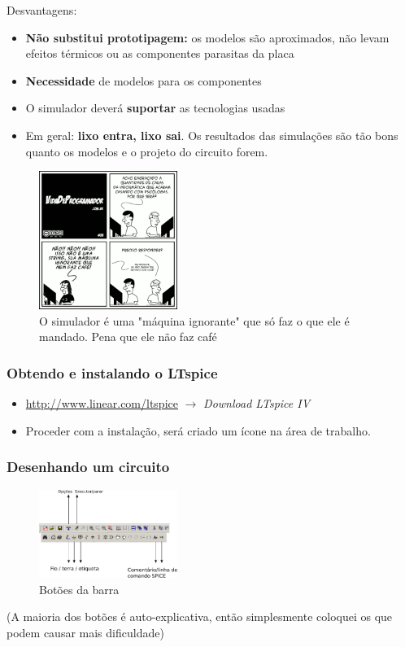 \documentclass{beamer}
\begin{document}
\begin{frame}
Desvantagens:
\begin{itemize}
\item{\textbf{Não substitui prototipagem:} os modelos são aproximados, não levam efeitos térmicos ou as componentes parasitas da placa}
\item{\textbf{Necessidade} de modelos para os componentes}
\item{O simulador deverá \textbf{suportar} as tecnologias usadas}
\item{Em geral: \textbf{lixo entra, lixo sai}. Os resultados das simulações são tão bons quanto os modelos e o projeto do circuito forem.}
\end{itemize}
\end{frame}

\begin{frame}

\begin{figure}[htb]
\includegraphics[width=170px]{images/tirinha33}
\caption{O simulador é uma "máquina ignorante" que só faz o que ele é mandado. Pena que ele não faz café}
\label{fig:lixoentrasai}
\end{figure}

\end{frame}

\begin{frame}
\frametitle{Obtendo e instalando o LTspice}
\begin{itemize}
\item \url{http://www.linear.com/ltspice} $\rightarrow$ \textit{Download LTspice IV}
\item Proceder com a instalação, será criado um ícone na área de trabalho.
\end{itemize}
\end{frame}

\begin{frame}
\frametitle{Desenhando um circuito}
\begin{figure}[htb]
\includegraphics[width=170px]{images/botoes_barra}
\caption{Botões da barra}
\label{fig:botoesbarra}
\end{figure}
(A maioria dos botões é auto-explicativa, então simplesmente coloquei os que podem causar mais dificuldade)
\end{frame}
\end{document}
